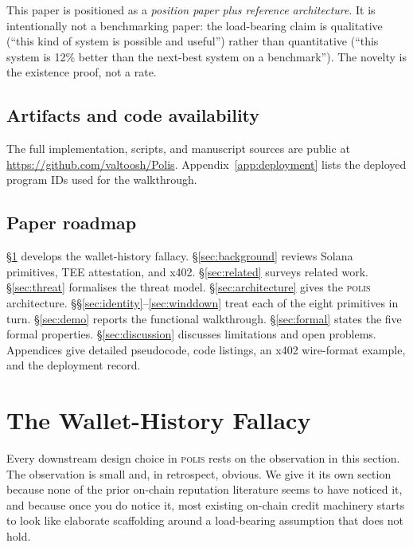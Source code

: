 \documentclass[10pt,conference,letterpaper]{IEEEtran}
\theoremstyle{definition}
\newcommand{\polis}{\textsc{polis}\xspace}
\begin{document}
This paper is positioned as a \emph{position paper plus reference
architecture}. It is intentionally not a benchmarking paper: the
load-bearing claim is qualitative (``this kind of system is possible
and useful'') rather than quantitative (``this system is 12\% better
than the next-best system on a benchmark''). The novelty is the
existence proof, not a rate.

\subsection{Artifacts and code availability}

The full implementation, scripts, and manuscript sources are public at
\url{https://github.com/valtoosh/Polis}. Appendix~\ref{app:deployment}
lists the deployed program IDs used for the walkthrough.

\subsection{Paper roadmap}

\S\ref{sec:wallet-fallacy} develops the wallet-history fallacy.
\S\ref{sec:background} reviews Solana primitives, TEE attestation, and
x402. \S\ref{sec:related} surveys related work. \S\ref{sec:threat}
formalises the threat model. \S\ref{sec:architecture} gives the \polis
architecture. \S\S\ref{sec:identity}--\ref{sec:winddown} treat each of
the eight primitives in turn. \S\ref{sec:demo} reports the
functional walkthrough. \S\ref{sec:formal} states the five
formal properties. \S\ref{sec:discussion} discusses limitations and
open problems. Appendices give detailed pseudocode, code listings, an
x402 wire-format example, and the deployment record.

\section{The Wallet-History Fallacy}\label{sec:wallet-fallacy}

Every downstream design choice in \polis rests on the observation in
this section. The observation is small and, in retrospect, obvious.
We give it its own section because none of the prior on-chain
reputation literature seems to have noticed it, and because once you
do notice it, most existing on-chain credit machinery starts to look
like elaborate scaffolding around a load-bearing assumption that
does not hold.
\end{document}
